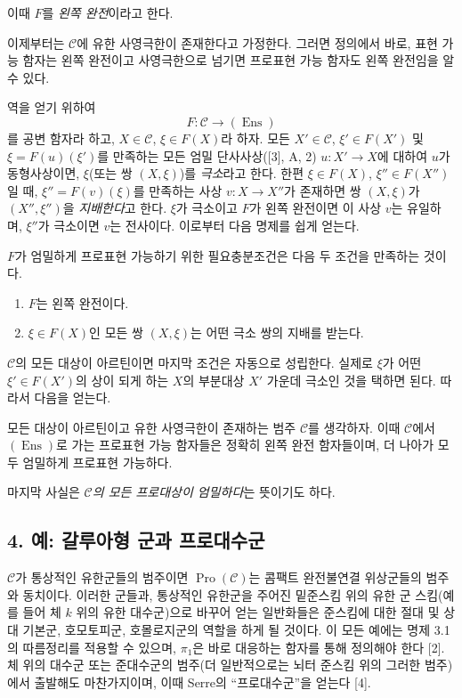 이때 $F$를 \emph{왼쪽 완전}이라고 한다.

이제부터는 $\mathcal C$에 유한 사영극한이 존재한다고 가정한다. 그러면
정의에서 바로, 표현 가능 함자는 왼쪽 완전이고 사영극한으로 넘기면
프로표현 가능 함자도 왼쪽 완전임을 알 수 있다.

역을 얻기 위하여
\[
  F:\mathcal C\longrightarrow(\operatorname{Ens})
\]
를 공변 함자라 하고, $X\in\mathcal C$, $\xi\in F(X)$라 하자. 모든
$X'\in\mathcal C$, $\xi'\in F(X')$ 및 $\xi=F(u)(\xi')$를 만족하는 모든
엄밀 단사사상([3], A, 2) $u:X'\longrightarrow X$에 대하여 $u$가
동형사상이면, $\xi$(또는 쌍 $(X,\xi)$)를 \emph{극소}라고 한다.
한편 $\xi\in F(X)$, $\xi''\in F(X'')$일 때, $\xi''=F(v)(\xi)$를 만족하는
사상 $v:X\longrightarrow X''$가 존재하면 쌍 $(X,\xi)$가 $(X'',\xi'')$을
\emph{지배한다}고 한다. $\xi$가 극소이고 $F$가 왼쪽 완전이면 이 사상
$v$는 유일하며, $\xi''$가 극소이면 $v$는 전사이다. 이로부터 다음 명제를
쉽게 얻는다.

 $F$가 엄밀하게 프로표현 가능하기 위한 필요충분조건은
다음 두 조건을 만족하는 것이다.
\begin{enumerate}
\item[(i)] $F$는 왼쪽 완전이다.
\item[(ii)] $\xi\in F(X)$인 모든 쌍 $(X,\xi)$는 어떤 극소 쌍의 지배를
받는다.
\end{enumerate}

$\mathcal C$의 모든 대상이 아르틴이면 마지막 조건은 자동으로 성립한다.
실제로 $\xi$가 어떤 $\xi'\in F(X')$의 상이 되게 하는 $X$의 부분대상
$X'$ 가운데 극소인 것을 택하면 된다. 따라서 다음을 얻는다.

 모든 대상이 아르틴이고 유한 사영극한이 존재하는 범주
$\mathcal C$를 생각하자. 이때 $\mathcal C$에서 $(\operatorname{Ens})$로 가는
프로표현 가능 함자들은 정확히 왼쪽 완전 함자들이며, 더 나아가 모두
엄밀하게 프로표현 가능하다.

마지막 사실은 \emph{$\mathcal C$의 모든 프로대상이 엄밀하다}는 뜻이기도
하다.

\subsection*{4. 예: 갈루아형 군과 프로대수군}

$\mathcal C$가 통상적인 유한군들의 범주이면 $\operatorname{Pro}(\mathcal C)$는
콤팩트 완전불연결 위상군들의 범주와 동치이다. 이러한 군들과, 통상적인
유한군을 주어진 밑준스킴 위의 유한 군 스킴(예를 들어 체 $k$ 위의 유한
대수군)으로 바꾸어 얻는 일반화들은 준스킴에 대한 절대 및 상대 기본군,
호모토피군, 호몰로지군의 역할을 하게 될 것이다. 이 모든 예에는 명제
3.1의 따름정리를 적용할 수 있으며, $\pi_1$은 바로 대응하는 함자를 통해
정의해야 한다 [2]. 체 위의 대수군 또는 준대수군의 범주(더 일반적으로는
뇌터 준스킴 위의 그러한 범주)에서 출발해도 마찬가지이며, 이때 Serre의
``프로대수군''을 얻는다 [4].

